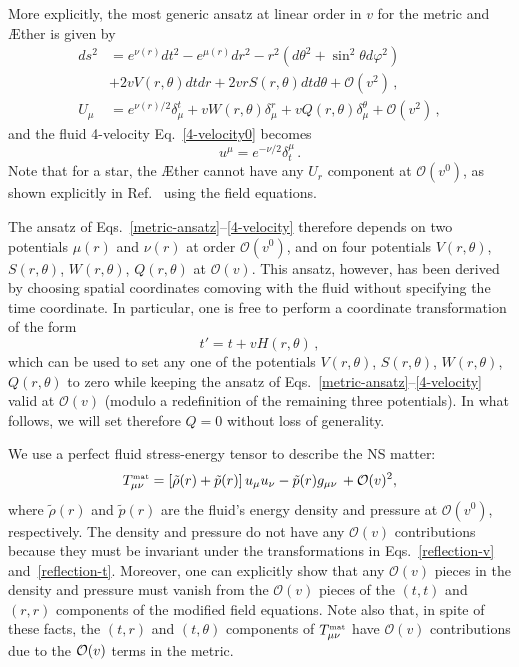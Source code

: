 \documentclass[prd,aps,twocolumn,nofootinbib,showpacs,superscriptaddress]{revtex4-1}
\newcommand\be{\begin{equation}}
\newcommand\ee{\end{equation}}
\newcommand{\nn}{\nonumber}
\newcommand{\MAT}{{\mbox{\tiny mat}}}
\begin{document}
More explicitly, the most generic ansatz at linear order in $v$ for the metric and \AE ther is given by 
%
\begin{align}
\label{metric-ansatz}
ds^2 &= e^{\nu (r)} dt^2 - e^{\mu (r)} d r^2 - r^2 \left( d\theta^2
+ \sin^2 \theta d \varphi^2 \right) 
\nn \\ 
& + 2 v V(r,\theta) dt dr +
2 v r S(r,\theta) dt d\theta + \mathcal{O}(v^2)\,,  
\\
\label{aether-ansatz} U_\mu &= e^{\nu(r)/2} \delta^t_\mu+ v W(r,\theta ) \delta_\mu^r+ v Q(r,\theta ) \delta_\mu^\theta +
\mathcal{O}(v^2)\,, 
\end{align}
% 
and the fluid 4-velocity Eq.~\eqref{4-velocity0} becomes
\be u^\mu =  e^{-\nu/2} \delta^\mu_t\,.
\label{4-velocity}
\ee
Note that for a star, the \AE ther cannot have any $U_r$ component at $\mathcal{O}(v^0)$, as shown explicitly in Ref.~\cite{Eling:2007xh} using the field equations.

The ansatz of Eqs.~\eqref{metric-ansatz}--\eqref{4-velocity} therefore depends on two potentials $\mu(r)$ and $\nu(r)$
at order $\mathcal{O}(v^0)$, and on four potentials $V(r,\theta)$, $S(r,\theta)$, $W(r,\theta)$, $Q(r,\theta)$ at $\mathcal{O}(v)$.
This ansatz, however, has been derived by choosing spatial coordinates comoving with the fluid without specifying the time coordinate. 
In particular, one is free to perform a coordinate transformation of the form  
%
\be t'= t + v H(r,\theta)\,,
\label{t-transform}
\ee
which can be used to set any one of the potentials $V(r,\theta)$, $S(r,\theta)$, $W(r,\theta)$, $Q(r,\theta)$
to zero while keeping the ansatz of Eqs.~\eqref{metric-ansatz}--\eqref{4-velocity} valid at $\mathcal{O}(v)$
(modulo a redefinition of the remaining three potentials).
In what follows, we will set therefore $Q=0$ without loss of generality.

We use a perfect fluid stress-energy tensor to describe the NS matter:
%
\be T_{\mu\nu}^\MAT = \left[ \tilde{\rho} (r) + \tilde{p}(r) \right]
u_\mu u_\nu - \tilde{p}(r) g_{\mu\nu}\,+{\cal O}(v)^2,
\label{Tmunu-mat}
\ee
%
where $\tilde{\rho} (r)$ and $\tilde{p}(r)$ are
the fluid's energy density and pressure at $\mathcal{O}(v^0)$, respectively. 
The density and pressure do not have any
$\mathcal{O}(v)$ contributions because they must be invariant under
the transformations in Eqs.~\eqref{reflection-v}
and~\eqref{reflection-t}. Moreover, one can explicitly show that any
$\mathcal{O}(v)$ pieces in the density and pressure must vanish
from the $\mathcal{O}(v)$ pieces of the $(t,t)$ and $(r,r)$ components
of the modified field equations. Note also that, in spite of these facts,
the $(t,r)$ and $(t,\theta)$ components of $T_{\mu\nu}^\MAT$ have
$\mathcal{O}(v)$ contributions due to the ${\cal O}(v)$ terms in the metric.
\end{document}
